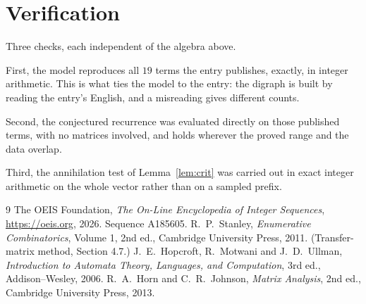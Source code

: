 \documentclass[11pt,a4paper]{article}
\theoremstyle{plain}
\theoremstyle{definition}
\begin{document}
\section{Verification}

Three checks, each independent of the algebra above.

First, the model reproduces all $19$ terms the entry publishes, exactly, in integer
arithmetic. This is what ties the model to the entry: the digraph is built by reading the
entry's English, and a misreading gives different counts.

Second, the conjectured recurrence was evaluated directly on those published terms, with no
matrices involved, and holds wherever the proved range and the data overlap.

Third, the annihilation test of Lemma~\ref{lem:crit} was carried out in exact integer
arithmetic on the whole vector rather than on a sampled prefix.

\begin{thebibliography}{9}
 The OEIS Foundation, \emph{The On-Line Encyclopedia of Integer
Sequences}, \url{https://oeis.org}, 2026. Sequence A185605.
 R.~P.~Stanley, \emph{Enumerative Combinatorics}, Volume 1, 2nd ed.,
Cambridge University Press, 2011. (Transfer-matrix method, Section 4.7.)
 J.~E.~Hopcroft, R.~Motwani and J.~D.~Ullman, \emph{Introduction to Automata
Theory, Languages, and Computation}, 3rd ed., Addison--Wesley, 2006.
 R.~A.~Horn and C.~R.~Johnson, \emph{Matrix Analysis}, 2nd ed., Cambridge
University Press, 2013.
\end{thebibliography}
\end{document}
